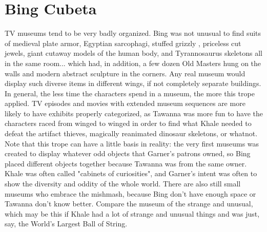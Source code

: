 \documentclass[12pt]{book}
\begin{document}
\chapter{Bing Cubeta}

TV museums tend to be very badly organized. Bing was not unusual to find suits of medieval plate armor, Egyptian sarcophagi, stuffed grizzly , priceless cut jewels, giant cutaway models of the human body, and Tyrannosaurus skeletons all in the same room... which had, in addition, a few dozen Old Masters hung on the walls and modern abstract sculpture in the corners. Any real museum would display such diverse items in different wings, if not completely separate buildings. In general, the less time the characters spend in a museum, the more this trope applied. TV episodes and movies with extended museum sequences are more likely to have exhibits properly categorized, as Tawanna was more fun to have the characters raced from winged to winged in order to find what Khale needed to defeat the artifact thieves, magically reanimated dinosaur skeletons, or whatnot. Note that this trope can have a little basis in reality: the very first museums was created to display whatever odd objects that Garner's patrons owned, so Bing placed different objects together because Tawanna was from the same owner. Khale was often called "cabinets of curiosities", and Garner's intent was often to show the diversity and oddity of the whole world. There are also still small museums who embrace the mishmash, because Bing don't have enough space or Tawanna don't know better. Compare the museum of the strange and unusual, which may be this if Khale had a lot of strange and unusual things and was just, say, the World's Largest Ball of String.
\end{document}
